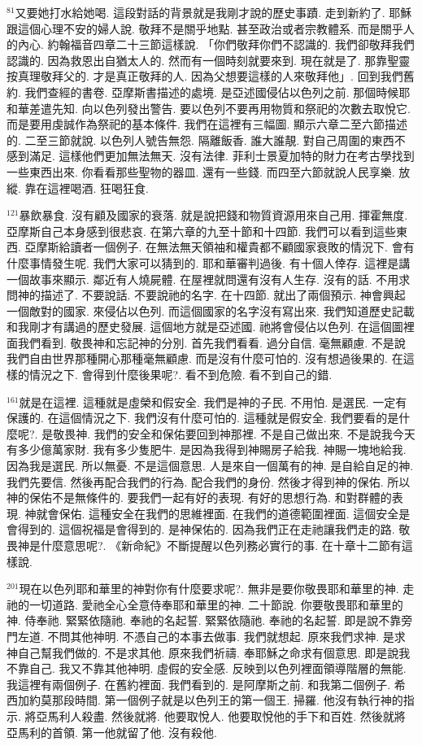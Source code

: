 \documentclass{book}
\begin{document}
$^{81}$又要她打水給她喝.
這段對話的背景就是我剛才說的歷史事蹟.
走到新約了.
耶穌跟這個心理不安的婦人說.
敬拜不是關乎地點.
甚至政治或者宗教體系.
而是關乎人的內心.
約翰福音四章二十三節這樣說.
「你們敬拜你們不認識的.
我們卻敬拜我們認識的.
因為救恩出自猶太人的.
然而有一個時刻就要來到.
現在就是了.
那靠聖靈按真理敬拜父的.
才是真正敬拜的人.
因為父想要這樣的人來敬拜他」.
回到我們舊約.
我們查經的書卷.
亞摩斯書描述的處境.
是亞述國侵佔以色列之前.
那個時候耶和華差遣先知.
向以色列發出警告.
要以色列不要再用物質和祭祀的次數去取悅它.
而是要用虔誠作為祭祀的基本條件.
我們在這裡有三幅圖.
顯示六章二至六節描述的.
二至三節就說.
以色列人號告無怨.
隔離飯香.
誰大誰靚.
對自己周圍的東西不感到滿足.
這樣他們更加無法無天.
沒有法律.
菲利士景夏加特的財力在考古學找到一些東西出來.
你看看那些聖物的器皿.
還有一些錢.
而四至六節就說人民享樂.
放縱.
靠在這裡喝酒.
狂喝狂食.

$^{121}$暴飲暴食.
沒有顧及國家的衰落.
就是說把錢和物質資源用來自己用.
揮霍無度.
亞摩斯自己本身感到很悲哀.
在第六章的九至十節和十四節.
我們可以看到這些東西.
亞摩斯給讀者一個例子.
在無法無天領袖和權貴都不顧國家衰敗的情況下.
會有什麼事情發生呢.
我們大家可以猜到的.
耶和華審判過後.
有十個人倖存.
這裡是講一個故事來顯示.
鄰近有人燒屍體.
在屋裡就問還有沒有人生存.
沒有的話.
不用求問神的描述了.
不要說話.
不要說祂的名字.
在十四節.
就出了兩個預示.
神會興起一個敵對的國家.
來侵佔以色列.
而這個國家的名字沒有寫出來.
我們知道歷史記載和我剛才有講過的歷史發展.
這個地方就是亞述國.
祂將會侵佔以色列.
在這個圖裡面我們看到.
敬畏神和忘記神的分別.
首先我們看看.
過分自信.
毫無顧慮.
不是說我們自由世界那種開心那種毫無顧慮.
而是沒有什麼可怕的.
沒有想過後果的.
在這樣的情況之下.
會得到什麼後果呢?.
看不到危險.
看不到自己的錯.

$^{161}$就是在這裡.
這種就是虛榮和假安全.
我們是神的子民.
不用怕.
是選民.
一定有保護的.
在這個情況之下.
我們沒有什麼可怕的.
這種就是假安全.
我們要看的是什麼呢?.
是敬畏神.
我們的安全和保佑要回到神那裡.
不是自己做出來.
不是說我今天有多少億萬家財.
我有多少隻肥牛.
是因為我得到神賜房子給我.
神賜一塊地給我.
因為我是選民.
所以無憂.
不是這個意思.
人是來自一個萬有的神.
是自給自足的神.
我們先要信.
然後再配合我們的行為.
配合我們的身份.
然後才得到神的保佑.
所以神的保佑不是無條件的.
要我們一起有好的表現.
有好的思想行為.
和對群體的表現.
神就會保佑.
這種安全在我們的思維裡面.
在我們的道德範圍裡面.
這個安全是會得到的.
這個祝福是會得到的.
是神保佑的.
因為我們正在走祂讓我們走的路.
敬畏神是什麼意思呢?.
《新命紀》不斷提醒以色列務必實行的事.
在十章十二節有這樣說.

$^{201}$現在以色列耶和華里的神對你有什麼要求呢?.
無非是要你敬畏耶和華里的神.
走祂的一切道路.
愛祂全心全意侍奉耶和華里的神.
二十節說.
你要敬畏耶和華里的神.
侍奉祂.
緊緊依隨祂.
奉祂的名起誓.
緊緊依隨祂.
奉祂的名起誓.
即是說不靠旁門左道.
不問其他神明.
不憑自己的本事去做事.
我們就想起.
原來我們求神.
是求神自己幫我們做的.
不是求其他.
原來我們祈禱.
奉耶穌之命求有個意思.
即是說我不靠自己.
我又不靠其他神明.
虛假的安全感.
反映到以色列裡面領導階層的無能.
我這裡有兩個例子.
在舊約裡面.
我們看到的.
是阿摩斯之前.
和我第二個例子.
希西加約莫那段時間.
第一個例子就是以色列王的第一個王.
掃羅.
他沒有執行神的指示.
將亞馬利人殺盡.
然後就將.
他要取悅人.
他要取悅他的手下和百姓.
然後就將亞馬利的首領.
第一他就留了他.
沒有殺他.
\end{document}
